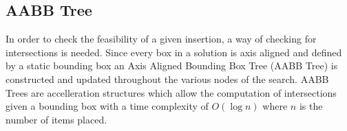 \subsection{AABB Tree}\label{chapter:heuristics:aabbtree}

In order to check the feasibility of a given insertion,
a way of checking for intersections is needed.
Since every box in a solution is axis aligned and defined by a static bounding box an Axis Aligned Bounding Box Tree (AABB Tree) is constructed and updated throughout the various nodes of the search.
AABB Trees are accelleration structures which allow the computation of intersections given a bounding box with a time complexity of $O(\log{n})$ where $n$ is the number of items placed.
